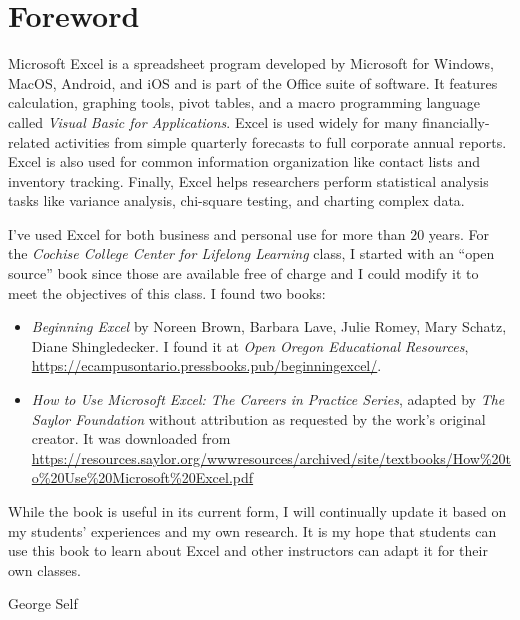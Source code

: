 \chapter*{Foreword}\label{ch:foreword}

Microsoft Excel is a spreadsheet program developed by Microsoft for Windows, MacOS, Android, and iOS and is part of the Office suite of software. It features calculation, graphing tools, pivot tables, and a macro programming language called \textit{Visual Basic for Applications}. Excel is used widely for many financially-related activities from simple quarterly forecasts to full corporate annual reports. Excel is also used for common information organization like contact lists and inventory tracking. Finally, Excel helps researchers perform statistical analysis tasks like variance analysis, chi-square testing, and charting complex data.

I've used Excel for both business and personal use for more than $ 20 $ years. For the \textit{Cochise College Center for Lifelong Learning} class, I started with an ``open source'' book since those are available free of charge and I could modify it to meet the objectives of this class. I found two books: 

\begin{itemize}
	\item \textit{Beginning Excel} by Noreen Brown, Barbara Lave, Julie Romey, Mary Schatz, Diane Shingledecker. I found it at \textit{Open Oregon Educational Resources}, \url{https://ecampusontario.pressbooks.pub/beginningexcel/}.

	\item \textit{How to Use Microsoft Excel: The Careers in Practice Series}, adapted by \textit{The Saylor Foundation} without attribution as requested by the work's original creator. It was downloaded from \url{https://resources.saylor.org/wwwresources/archived/site/textbooks/How%20to%20Use%20Microsoft%20Excel.pdf}
\end{itemize}

While the book is useful in its current form, I will continually update it based on my students' experiences and my own research. It is my hope that students can use this book to learn about Excel and other instructors can adapt it for their own classes.

\bigskip
\begin{flushright}
  \textemdash \; George Self
\end{flushright}
